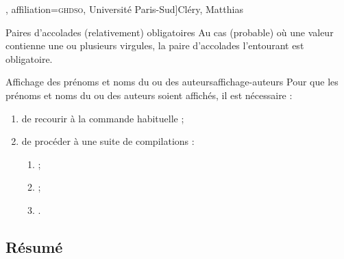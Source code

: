 \documentclass[french,nolocaltoc]{nwejmart}
\newtheorem[style=definition]{fait}
\newtheorem[title=contraventionnalisation]{ctrv}
\newtheorem[title-plural=anneaux]{anneau}
\newtheorem[title-plural=idéaux]{idéal}
\begin{document}

\begin{bodycode}
\author[
  affiliation={Laboratoire \textsc{sphere}, Université Paris Diderot}
  ]{Bustamante, Martha-Cecilia}
\author[
  affiliation=[aff2]{\textsc{lpma}, Université Pierre et Marie Curie},
  affiliation={\textsc{ghdso}, Université Paris-Sud}]{Cléry, Matthias}
\author[
  affiliationtagged={aff2}
]{Mazliak, Laurent}
\end{bodycode}

\begin{dbwarning}{Paires d'accolades
    (relativement) obligatoires}{}
  Au cas (probable) où une valeur  contienne une ou plusieurs
  virgules, la paire d'accolades l'entourant est obligatoire.
\end{dbwarning}

\begin{dbwarning}{Affichage des prénoms et noms du ou des
    auteurs}{affichage-auteurs}
  Pour que les prénoms et noms du ou des auteurs soient affichés, il est
  nécessaire :
  \begin{enumerate}
  \item de recourir à la commande habituelle  ;
  \item de procéder à une suite de compilations\suitecompilations{} :
    \begin{enumerate}
    \item {} ;
    \item {} ;
    \item {}.
    \end{enumerate}
  \end{enumerate}
\end{dbwarning}

\subsection{Résumé}
\label{sec-resume}
\end{document}
